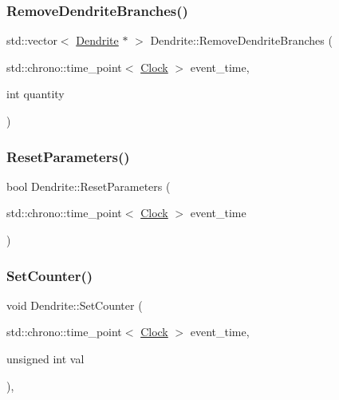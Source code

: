 \mbox{\label{classDendrite_a15396dce5e1d920fcd1477b9a255dabf}} 
\subsubsection{\texorpdfstring{Remove\+Dendrite\+Branches()}{RemoveDendriteBranches()}}
{\footnotesize\ttfamily std\+::vector$<$ \mbox{\hyperlink{classDendrite}{Dendrite}} $\ast$ $>$ Dendrite\+::\+Remove\+Dendrite\+Branches (\begin{DoxyParamCaption}\item[{std\+::chrono\+::time\+\_\+point$<$ \mbox{\hyperlink{universe_8h_a0ef8d951d1ca5ab3cfaf7ab4c7a6fd80}{Clock}} $>$}]{event\+\_\+time,  }\item[{int}]{quantity }\end{DoxyParamCaption})}

\mbox{\label{classDendrite_a6a6290955348051819badb801b753901}} 
\subsubsection{\texorpdfstring{Reset\+Parameters()}{ResetParameters()}}
{\footnotesize\ttfamily bool Dendrite\+::\+Reset\+Parameters (\begin{DoxyParamCaption}\item[{std\+::chrono\+::time\+\_\+point$<$ \mbox{\hyperlink{universe_8h_a0ef8d951d1ca5ab3cfaf7ab4c7a6fd80}{Clock}} $>$}]{event\+\_\+time }\end{DoxyParamCaption})}

\mbox{\label{classDendrite_a7529495515de74fff2b9a92b12531057}} 
\subsubsection{\texorpdfstring{Set\+Counter()}{SetCounter()}}
{\footnotesize\ttfamily void Dendrite\+::\+Set\+Counter (\begin{DoxyParamCaption}\item[{std\+::chrono\+::time\+\_\+point$<$ \mbox{\hyperlink{universe_8h_a0ef8d951d1ca5ab3cfaf7ab4c7a6fd80}{Clock}} $>$}]{event\+\_\+time,  }\item[{unsigned int}]{val }\end{DoxyParamCaption})\hspace{0.3cm}{\ttfamily [inline]}, {\ttfamily [virtual]}}



